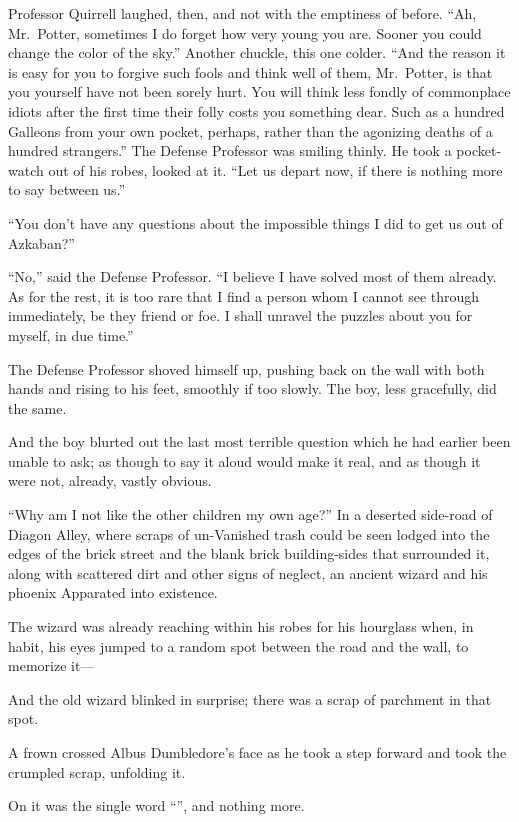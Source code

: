 Professor Quirrell laughed, then, and not with the emptiness of before. “Ah, Mr.~Potter, sometimes I do forget how very young you are. Sooner you could change the color of the sky.” Another chuckle, this one colder. “And the reason it is easy for you to forgive such fools and think well of them, Mr.~Potter, is that you yourself have not been sorely hurt. You will think less fondly of commonplace idiots after the first time their folly costs you something dear. Such as a hundred Galleons from your own pocket, perhaps, rather than the agonizing deaths of a hundred strangers.” The Defense Professor was smiling thinly. He took a pocket-watch out of his robes, looked at it. “Let us depart now, if there is nothing more to say between us.”

“You don’t have any questions about the impossible things I did to get us out of Azkaban?”

“No,” said the Defense Professor. “I believe I have solved most of them already. As for the rest, it is too rare that I find a person whom I cannot see through immediately, be they friend or foe. I shall unravel the puzzles about you for myself, in due time.”

The Defense Professor shoved himself up, pushing back on the wall with both hands and rising to his feet, smoothly if too slowly. The boy, less gracefully, did the same.

And the boy blurted out the last most terrible question which he had earlier been unable to ask; as though to say it aloud would make it real, and as though it were not, already, vastly obvious.

“Why am I not like the other children my own age?”
\sbreak
In a deserted side-road of Diagon Alley, where scraps of un-Vanished trash could be seen lodged into the edges of the brick street and the blank brick building-sides that surrounded it, along with scattered dirt and other signs of neglect, an ancient wizard and his phoenix Apparated into existence.

The wizard was already reaching within his robes for his hourglass when, in habit, his eyes jumped to a random spot between the road and the wall, to memorize it—

And the old wizard blinked in surprise; there was a scrap of parchment in that spot.

A frown crossed Albus Dumbledore’s face as he took a step forward and took the crumpled scrap, unfolding it.

On it was the single word “”, and nothing more.

